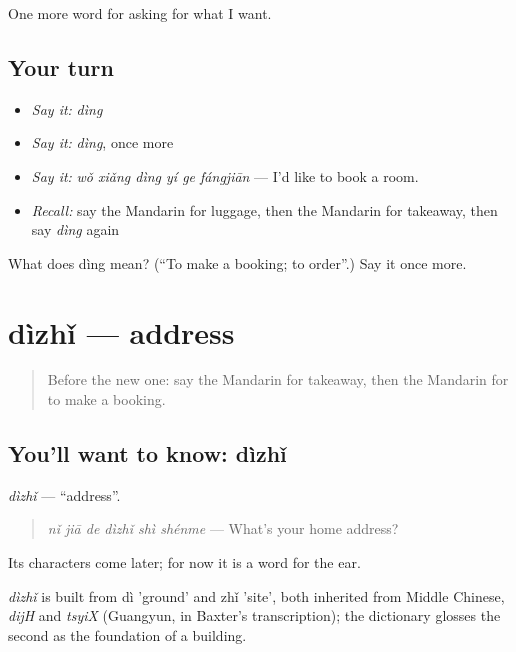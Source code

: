 \begin{grammarlens}[title={What you've built}]
One more word for asking for what I want.
\end{grammarlens}

\subsection*{Your turn}
\begin{itemize}
\raggedright
  \item \emph{Say it:} \emph{dìng}
  \item \emph{Say it:} \emph{dìng}, once more
  \item \emph{Say it:} \emph{wǒ xiǎng dìng yí ge fángjiān} — I'd like to book a room.
  \item \emph{Recall:} say the Mandarin for luggage, then the Mandarin for takeaway, then say \emph{dìng} again
\end{itemize}

\begin{tcolorbox}[breakable,colback=teal!4,colframe=teal!35!black,title={Before you move on}]
What does dìng mean? (\textquotedblleft{}To make a booking; to order\textquotedblright{}.) Say it once more.
\end{tcolorbox}
\section[dìzhǐ]{dìzhǐ — address}

\label{lesson:ZH-C120-dizhi}



\begin{quote}
Before the new one: say the Mandarin for takeaway, then the Mandarin for to make a booking.
\end{quote}

\subsection*{You'll want to know: dìzhǐ}
\emph{dìzhǐ} — \textquotedblleft{}address\textquotedblright{}.

\begin{quote}
\emph{nǐ jiā de dìzhǐ shì shénme} — What's your home address?
\end{quote}

Its characters come later; for now it is a word for the ear.

\begin{cousinweb}
\emph{dìzhǐ} is built from dì 'ground' and zhǐ 'site', both inherited from Middle Chinese, \emph{dijH} and \emph{tsyiX} (Guangyun, in Baxter's transcription); the dictionary glosses the second as the foundation of a building.
\end{cousinweb}

